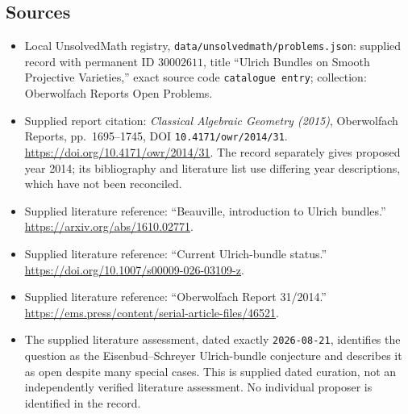 \documentclass[11pt]{article}
\begin{document}
\subsection{Sources}
\begin{itemize}
\item Local UnsolvedMath registry, \texttt{data/unsolvedmath/problems.json}: supplied record with permanent ID \(30002611\), title ``Ulrich Bundles on Smooth Projective Varieties,'' exact source code \texttt{catalogue entry}; collection: Oberwolfach Reports Open Problems.
\item Supplied report citation: \emph{Classical Algebraic Geometry (2015)}, Oberwolfach Reports, pp.\ 1695--1745, DOI \texttt{10.4171/owr/2014/31}. \url{https://doi.org/10.4171/owr/2014/31}. The record separately gives proposed year 2014; its bibliography and literature list use differing year descriptions, which have not been reconciled.
\item Supplied literature reference: ``Beauville, introduction to Ulrich bundles.'' \url{https://arxiv.org/abs/1610.02771}.
\item Supplied literature reference: ``Current Ulrich-bundle status.'' \url{https://doi.org/10.1007/s00009-026-03109-z}.
\item Supplied literature reference: ``Oberwolfach Report 31/2014.'' \url{https://ems.press/content/serial-article-files/46521}.
\item The supplied literature assessment, dated exactly \texttt{2026-08-21}, identifies the question as the Eisenbud--Schreyer Ulrich-bundle conjecture and describes it as open despite many special cases. This is supplied dated curation, not an independently verified literature assessment. No individual proposer is identified in the record.
\end{itemize}
\end{document}
